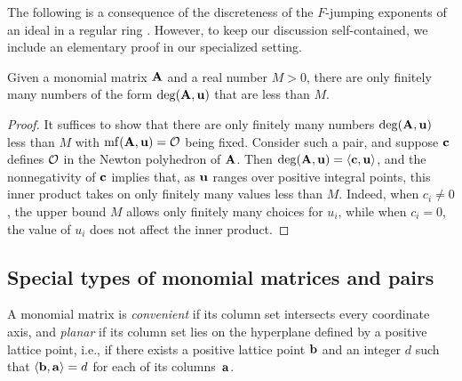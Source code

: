 \documentclass{amsart}
\begin{document}

The following is a consequence of the discreteness of the $F$-jumping exponents of an ideal in a regular ring \cite[Theorem~3.1]{blickle+mustata+smith.discr_rat_FPTs}.
However, to keep our discussion self-contained, we include an elementary proof in our specialized setting.

\begin{proposition}
   \label{discreteness: P}
   Given a monomial matrix $\mathbf{A}$ and a real number $M > 0 $, there are only finitely many numbers of the form $\operatorname{deg}(\mathbf{A},\mathbf{u})$ that are less than $M$.
\end{proposition}

\begin{proof}
   It suffices to show that there are only finitely many numbers $\operatorname{deg}(\mathbf{A},\mathbf{u})$ less than $M$ with $\operatorname{mf}(\mathbf{A}, \mathbf{u}) = \mathcal{O}$ being fixed.
   Consider such a pair, and suppose $\mathbf{c}$ defines $\mathcal{O}$ in the Newton polyhedron of $\mathbf{A}$.
   Then $\operatorname{deg}(\mathbf{A},\mathbf{u}) = \langle \mathbf{c}, \mathbf{u} \rangle$, and the nonnegativity of $\mathbf{c}$ implies that, as $\mathbf{u}$ ranges over positive integral points, this inner product takes on only finitely many values less than $M$.
   Indeed, when $c_i \ne 0$, the upper bound $M$ allows only finitely many choices for $u_i$, while when $c_i = 0$, the value of $u_i$ does not affect the inner product.
\end{proof}

\subsection{Special types of monomial matrices and pairs}
\label{ss: special matrices and pairs}

\begin{definition}
   A monomial matrix is \emph{convenient} if its column set intersects every coordinate axis, and \emph{planar} if its column set lies on the hyperplane defined by a positive lattice point, i.e., if there exists a positive lattice point $\mathbf{b}$ and an integer $d$ such that $\langle \mathbf{b}, \mathbf{a} \rangle = d$ for each of its columns~$\mathbf{a}$.
\end{definition}
\end{document}
